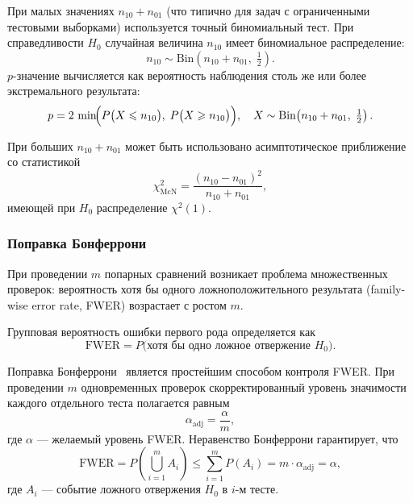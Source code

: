 При малых значениях $n_{10} + n_{01}$ (что типично для задач с
ограниченными тестовыми выборками) используется точный биномиальный
тест. При справедливости $H_0$ случайная величина $n_{10}$ имеет
биномиальное распределение:
\begin{equation}
    n_{10} \sim \mathrm{Bin}\!\left(n_{10} + n_{01},\; \tfrac{1}{2}\right).
    \label{eq:mcnemar-binom}
\end{equation}
$p$-значение вычисляется как вероятность наблюдения столь же или более
экстремального результата:
\begin{equation}
    p = 2\,\min\!\Bigl(
        P\bigl(X \leqslant n_{10}\bigr),\;
        P\bigl(X \geqslant n_{10}\bigr)
    \Bigr),
    \quad X \sim \mathrm{Bin}\!\left(n_{10}+n_{01},\; \tfrac{1}{2}\right).
    \label{eq:mcnemar-pvalue}
\end{equation}

При больших $n_{10} + n_{01}$ может быть использовано асимптотическое
приближение со статистикой
\begin{equation}
    \chi^{2}_{\mathrm{McN}} = \frac{(n_{10} - n_{01})^{2}}{n_{10} + n_{01}},
    \label{eq:mcnemar-chi2}
\end{equation}
имеющей при $H_0$ распределение $\chi^{2}(1)$.

\subsubsection{Поправка Бонферрони}
\label{subsubsec:bonferroni}

При проведении $m$ попарных сравнений возникает проблема множественных
проверок: вероятность хотя бы одного ложноположительного результата
(family-wise error rate, FWER) возрастает с ростом $m$.

\begin{definition}[FWER]
\label{def:fwer}
Групповая вероятность ошибки первого рода определяется как
\begin{equation}
    \mathrm{FWER} = P\bigl(\text{хотя бы одно ложное отвержение } H_0\bigr).
    \label{eq:fwer}
\end{equation}
\end{definition}

Поправка Бонферрони~\cite{bonferroni1936teoria, dunn1961multiple} является
простейшим способом контроля FWER. При проведении $m$ одновременных проверок
скорректированный уровень значимости каждого отдельного теста полагается
равным
\begin{equation}
    \alpha_{\mathrm{adj}} = \frac{\alpha}{m},
    \label{eq:bonferroni}
\end{equation}
где $\alpha$ --- желаемый уровень FWER. Неравенство Бонферрони
гарантирует, что
\begin{equation}
    \mathrm{FWER} = P\!\left(\bigcup_{i=1}^{m} A_i\right)
    \leqslant \sum_{i=1}^{m} P(A_i)
    = m \cdot \alpha_{\mathrm{adj}} = \alpha,
    \label{eq:bonferroni-proof}
\end{equation}
где $A_i$ --- событие ложного отвержения $H_0$ в $i$-м тесте.

